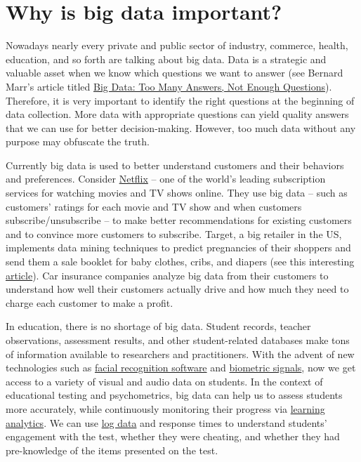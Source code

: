 \documentclass[]{book}
\begin{document}
\hypertarget{why-is-big-data-important}{%
\section{Why is big data important?}\label{why-is-big-data-important}}

Nowadays nearly every private and public sector of industry, commerce, health, education, and so forth are talking about big data. Data is a strategic and valuable asset when we know which questions we want to answer (see Bernard Marr's article titled \href{https://www.forbes.com/sites/bernardmarr/2015/08/25/big-data-too-many-answers-not-enough-questions/\#527635fb1361}{Big Data: Too Many Answers, Not Enough Questions}). Therefore, it is very important to identify the right questions at the beginning of data collection. More data with appropriate questions can yield quality answers that we can use for better decision-making. However, too much data without any purpose may obfuscate the truth.

Currently big data is used to better understand customers and their behaviors and preferences. Consider \href{https://www.netflix.com}{Netflix} -- one of the world's leading subscription services for watching movies and TV shows online. They use big data -- such as customers' ratings for each movie and TV show and when customers subscribe/unsubscribe -- to make better recommendations for existing customers and to convince more customers to subscribe. Target, a big retailer in the US, implements data mining techniques to predict pregnancies of their shoppers and send them a sale booklet for baby clothes, cribs, and diapers (see this interesting \href{https://www.driveresearch.com/single-post/2016/12/06/How-Target-Used-Data-Analytics-to-Predict-Pregnancies}{article}). Car insurance companies analyze big data from their customers to understand how well their customers actually drive and how much they need to charge each customer to make a profit.

In education, there is no shortage of big data. Student records, teacher observations, assessment results, and other student-related databases make tons of information available to researchers and practitioners. With the advent of new technologies such as \href{https://www.edweek.org/ew/articles/2016/01/13/the-future-of-big-data-and-analytics.html}{facial recognition software} and \href{https://www.smartdatacollective.com/jay-z-kanye-west-used-biometrics-beat-album-leaks/}{biometric signals}, now we get access to a variety of visual and audio data on students. In the context of educational testing and psychometrics, big data can help us to assess students more accurately, while continuously monitoring their progress via \href{https://isit.arts.ubc.ca/learning-analytics-examples/}{learning analytics}. We can use \href{https://link.springer.com/content/pdf/10.1007\%2Fs41237-018-0063-y.pdf}{log data} and response times to understand students' engagement with the test, whether they were cheating, and whether they had pre-knowledge of the items presented on the test.
\end{document}
